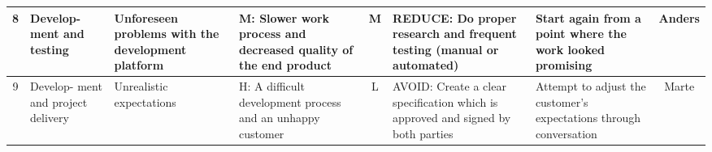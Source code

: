 \begin{landscape}
\begin{table}
\begin{tabular}{| c | p{1.5cm} | p{4cm} | p{4cm} | c | p{4cm} | p{4cm} | c |}
   	8 & Develop- ment and testing & Unforeseen problems with the development platform & 
	M: Slower work process and decreased quality of the end product & M & REDUCE: Do proper research and frequent testing (manual or automated) & Start again from a point where the work looked promising &Anders \\ \hline

   	9 & Develop- ment and project delivery & Unrealistic expectations & H: A difficult development process and an unhappy customer & L & AVOID: Create a clear specification which is approved and signed by both parties & Attempt to adjust the customer’s expectations through conversation & Marte \\
   	\hline
    \end{tabular}
    \end{table}
\end{landscape}
